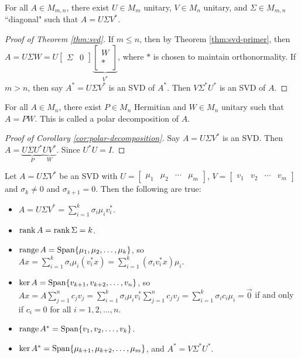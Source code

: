 \begin{theorem}
\label{thm:svd}
For all $A \in M_{m,n}$, there exist $U \in M_m$ unitary, $V \in M_n$ unitary, and $\Sigma \in M_{m,n}$ ``diagonal" such that $A = U\Sigma V^*$.
\end{theorem}

\begin{proof}[Proof of Theorem \ref{thm:svd}]
If $m \leq n$, then by Theorem \ref{thm:svd-primer}, then $A = U\Sigma W = U[\begin{array}{c|c}\Sigma & 0\end{array}] \underbrace{\left[\begin{array}{c}W \\ *\end{array}\right]}_{V^*}$, where $*$ is chosen to maintain orthonormality. If $m > n$, then say $A^* = U\Sigma V^*$ is an SVD of $A^*$. Then $V \Sigma^* U^*$ is an SVD of $A$.
\end{proof}

\begin{corollary}
\label{cor:polar-decomposition}
For all $A \in M_n$, there exist $P \in M_n$ Hermitian and $W \in M_n$ unitary such that $A = PW$. This is called a polar decomposition of $A$.
\end{corollary}

\begin{proof}[Proof of Corollary \ref{cor:polar-decomposition}]
Say $A = U\Sigma V^*$ is an SVD. Then $A = \underbrace{U\Sigma U^*}_{P}\underbrace{U V^*}_W$. Since $U^*U = I$.
\end{proof}

\begin{note*}
Let $A = U\Sigma V^*$ be an SVD with $U = [\begin{array}{c|c|c|c} \mu_1 & \mu_2 & \cdots & \mu_m \end{array}]$, $V = [\begin{array}{c|c|c|c} v_1 & v_2 & \cdots & v_m \end{array}]$ and $\sigma_k \not= 0$ and $\sigma_{k+1}=0$. Then the following are true:
\begin{itemize}
    \item $A = U\Sigma V^* = \sum_{i=1}^k \sigma_i \mu_i v_i^*$.
    \item $\operatorname{rank} A = \operatorname{rank} \Sigma = k$.
    \item $\operatorname{range} A = \operatorname{Span}\{\mu_1, \mu_2, \dots, \mu_k\}$, so $Ax = \sum_{i=1}^k \sigma_i \mu_i (v_i^* x) = \sum_{i=1}^k (\sigma_i v_i^* x) \mu_i$.
    \item $\operatorname{ker} A = \operatorname{Span}\{v_{k+1}, v_{k+2}, \dots, v_n\}$, so $Ax = A\sum_{j=1}^n c_j v_j = \sum_{i=1}^k \sigma_i \mu_i v_i^* \sum_{j=1}^n c_j v_j = \sum_{i=1}^k \sigma_i c_i \mu_i = \Vec{0}$ if and only if $c_i = 0$ for all $i = 1, 2, \dots, n$.
    \item $\operatorname{range} A^* = \operatorname{Span} \{v_1, v_2, \dots, v_k\}$.
    \item $\operatorname{ker} A^* = \operatorname{Span} \{\mu_{k+1}, \mu_{k+2}, \dots, \mu_m\}$, and $A^* = V\Sigma^* U^*$.
\end{itemize}
\end{note*}

